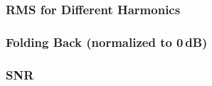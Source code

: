 
\begin{frame}
    \frametitle{RMS for Different Harmonics}
    \centering
    
\end{frame}

\begin{frame}
    \frametitle{Folding Back (normalized to 0\,dB)}
    \centering
    
\end{frame}

\begin{frame}
    \frametitle{SNR}
    \centering
    
\end{frame}
